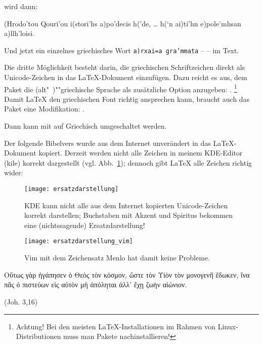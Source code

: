 wird dann:

 \begin{ibycus}
  (Hrodo'tou Qouri’ou i(stori’hs a)po’decis h(’de,
  \dots
  h(‘n ai)ti’hn e)pole’mhsan a)llh’loisi.
  \end{ibycus}

 Und jetzt ein einzelnes griechisches Wort \lstinline/a)rxai=a gra’mmata/ --  -- im Text.


Die dritte Möglichkeit besteht darin, die griechischen Schriftzeichen direkt als Unicode-Zeichen
in das \LaTeX -Dokument einzufügen. Dazu reicht es aus, dem Paket  die
(alt"~)""griechische Sprache als zusätzliche Option anzugeben:
 .%
\footnote{Achtung! Bei den meisten \LaTeX-Installationen im Rahmen von Linux-Distributionen muss
man Pakete nachinstallieren!}
Damit \LaTeX{} den griechischen Font richtig ansprechen kann, braucht auch das Paket 
eine Modifikation:  .

Dann kann mit  auf Griechisch umgeschaltet werden.

Der folgende Bibelvers wurde aus dem Internet unverändert in das \LaTeX-Dokument
kopiert. Derzeit werden nicht alle Zeichen in meinem KDE-Editor (kile) korrekt dargestellt 
(vgl. Abb.~\ref{fig:kile}); dennoch gibt \LaTeX{} alle Zeichen richtig wider:

\begin{figure}
 \texttt{[image: ersatzdarstellung]}
 \caption{KDE kann nicht alle aus dem Internet kopierten Unicode-Zeichen korrekt darstellen;
 Buchstaben mit Akzent und Spiritus bekommen eine (nichtssagende) Ersatzdarstellung!}
 \label{fig:kile}
\end{figure}

\begin{figure}
 \texttt{[image: ersatzdarstellung\_vim]}
 \caption{Vim mit dem Zeichensatz Menlo hat damit keine Probleme.}
 \label{fig:griechsich-vim}
\end{figure}

\begin{otherlanguage}{polutonikogreek}
Οὕτως γὰρ ἠγάπησεν ὁ Θεὸς τὸν κόσμον, ὥστε τὸν Υἱὸν τὸν μονογενῆ ἔδωκεν,
ἵνα πᾶς ὁ πιστεύων εἰς αὐτὸν μὴ ἀπόληται ἀλλ’ ἔχῃ ζωὴν αἰώνιον.
\end{otherlanguage}
(Joh. 3,16)

